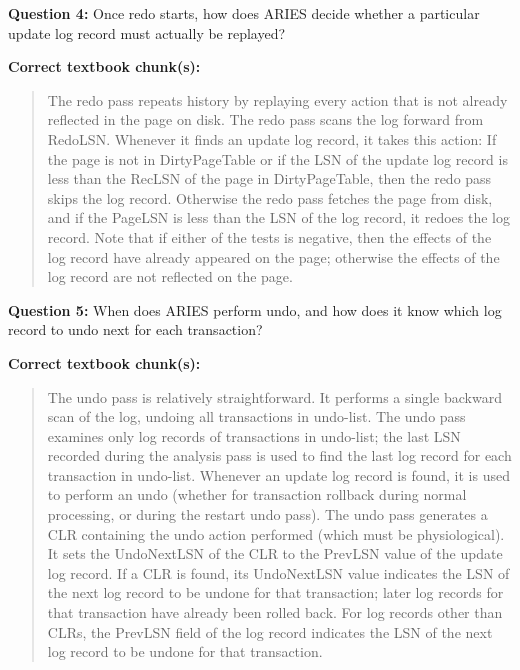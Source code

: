 \documentclass[10pt,twocolumn]{article}
\begin{document}
\textbf{Question 4:} Once redo starts, how does ARIES decide whether a particular update log record must actually be replayed?

\textbf{Correct textbook chunk(s):}
\begin{quote}\small
The redo pass repeats history by replaying every action that is not already reflected in the page on disk. The redo pass scans the log forward from RedoLSN. Whenever it finds an update log record, it takes this action: If the page is not in DirtyPageTable or if the LSN of the update log record is less than the RecLSN of the page in DirtyPageTable, then the redo pass skips the log record. Otherwise the redo pass fetches the page from disk, and if the PageLSN is less than the LSN of the log record, it redoes the log record. Note that if either of the tests is negative, then the effects of the log record have already appeared on the page; otherwise the effects of the log record are not reflected on the page.
\end{quote}

\textbf{Question 5:} When does ARIES perform undo, and how does it know which log record to undo next for each transaction?

\textbf{Correct textbook chunk(s):}
\begin{quote}\small
The undo pass is relatively straightforward. It performs a single backward scan of the log, undoing all transactions in undo-list. The undo pass examines only log records of transactions in undo-list; the last LSN recorded during the analysis pass is used to find the last log record for each transaction in undo-list. Whenever an update log record is found, it is used to perform an undo (whether for transaction rollback during normal processing, or during the restart undo pass). The undo pass generates a CLR containing the undo action performed (which must be physiological). It sets the UndoNextLSN of the CLR to the PrevLSN value of the update log record. If a CLR is found, its UndoNextLSN value indicates the LSN of the next log record to be undone for that transaction; later log records for that transaction have already been rolled back. For log records other than CLRs, the PrevLSN field of the log record indicates the LSN of the next log record to be undone for that transaction.
\end{quote}
\end{document}
